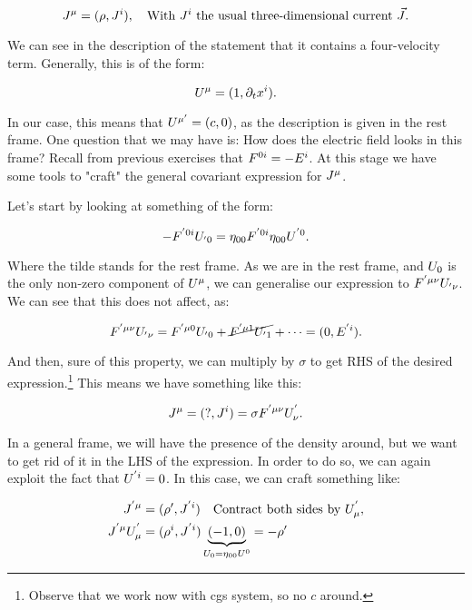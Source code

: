 \begin{equation}
	J^{\mu }= ( \rho, J^{i }), \quad \text{With $J^{i }$ the usual three-dimensional current $\vec{J}$.}
\end{equation}

We can see in the description of the statement that it contains a four-velocity term. Generally, this is of the form:

\begin{equation}
	U^{\mu } = (1, \partial_{t} x^{i}).
\end{equation}

In our case, this means that $U^{\mu ' } = (c,0)$, as the description is given in the rest frame. One question that we may have is: How does the electric field looks in this frame? Recall from previous exercises that $F^{0i } = - E^{i}$. At this stage we have some tools to "craft" the general covariant expression for $J^{\mu }$.

Let's start by looking at something of the form:

\begin{equation}
	- F^{' 0 i } U_{' 0 } = \eta_{00}F^{' 0 i } \eta_{00} U^{' 0 }.
\end{equation}

Where the tilde stands for the rest frame. As we are in the rest frame, and $U_{0 }$ is the only non-zero component of $U^{\mu }$, we can generalise our expression to $F^{'\mu\nu } U_{'\nu }$. We can see that this does not affect, as:

\begin{equation}
	F^{'\mu\nu } U_{'\nu } = F^{'\mu 0  } U_{' 0  } + \cancel{F^{'\mu 1 } U_{' 1 }} + \cdots = (0, E^{'i}).
\end{equation}

And then, sure of this property, we can multiply by $\sigma$ to get RHS of the desired expression.\footnote{Observe that we work now with cgs system, so no $c$ around.} This means we have something like this:

\begin{equation}
	J^{\mu } = (\text{?}, J^{i }) = \sigma F^{'\mu\nu } U_{\nu }^{'}.
\end{equation}

In a general frame, we will have the presence of the density around, but we want to get rid of it in the LHS of the expression. In order to do so, we can again exploit the fact that $U^{'i } = 0$. In this case, we can craft something like:

\begin{equation}
	\begin{split}
		J^{'\mu } &= ( \rho', J^{'i }) \quad \text{Contract both sides by $U_{\mu }^{'}$},\\
		J^{'\mu } U_{\mu }^{'} &= ( \rho^{i} , J^{' i })\underbrace{(-1,0)}_{U_{0 }=\eta_{00}U^{0 }} = - \rho'\\ 
	\end{split}
\end{equation}

